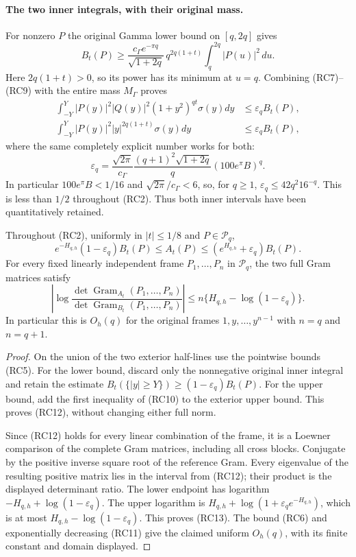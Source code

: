 \paragraph{The two inner integrals, with their original mass.}
For nonzero $P$ the original Gamma lower bound on $[q,2q]$ gives
\[
 B_t(P)\geq
 \frac{c_\Gamma e^{-\pi q}}{\sqrt{1+2q}}\,
 q^{2q(1+t)}\int_q^{2q}|P(u)|^2\,du.              \tag{RC9}
\]
Here $2q(1+t)>0$, so its power has its minimum at $u=q$.
Combining (RC7)--(RC9) with the entire mass $M_\Gamma$ proves
\[
 \begin{split}
 \int_{-Y}^Y|P(y)|^2|Q(y)|^2(1+y^2)^{qt}\sigma(y)dy
       &\leq\varepsilon_q B_t(P),\\
 \int_{-Y}^Y|P(y)|^2|y|^{2q(1+t)}\sigma(y)dy
       &\leq\varepsilon_q B_t(P),
 \end{split}                                    \tag{RC10}
\]
where the same completely explicit number works for both:
\[
 \varepsilon_q=
 \frac{\sqrt{2\pi}}{c_\Gamma}
 \frac{(q+1)^2\sqrt{1+2q}}{q}
          \left(100e^\pi B\right)^q.             \tag{RC11}
\]
In particular $100e^\pi B<1/16$ and
$\sqrt{2\pi}/c_\Gamma<6$, so, for $q\geq1$,
$\varepsilon_q\leq42q^2 16^{-q}$.
This is less than $1/2$ throughout (RC2).
Thus both inner intervals have been quantitatively retained.

\begin{theorem}
Throughout (RC2), uniformly in $|t|\leq1/8$ and
$P\in\mathcal P_q$,
\[
 e^{-H_{q,h}}(1-\varepsilon_q)B_t(P)
 \leq A_t(P)\leq(e^{H_{q,h}}+\varepsilon_q)B_t(P).
 \tag{RC12}
\]
For every fixed linearly independent frame $P_1,\ldots,P_n$
in $\mathcal P_q$, the two full Gram matrices satisfy
\[
 \left|\log
 \frac{\det\operatorname{Gram}_{A_t}(P_1,\ldots,P_n)}
      {\det\operatorname{Gram}_{B_t}(P_1,\ldots,P_n)}
 \right|
 \leq n\{H_{q,h}-\log(1-\varepsilon_q)\}.
 \tag{RC13}
\]
In particular this is $O_h(q)$ for the original frames
$1,y,\ldots,y^{n-1}$ with $n=q$ and $n=q+1$.
\end{theorem}
\begin{proof}
On the union of the two exterior half-lines use the pointwise bounds
(RC5). For the lower bound, discard only the nonnegative original inner
integral and retain the estimate
$B_t(\{|y|\geq Y\})\geq(1-\varepsilon_q)B_t(P)$.
For the upper bound, add the first inequality of (RC10) to the exterior
upper bound. This proves (RC12), without changing either full norm.

Since (RC12) holds for every linear combination of the frame, it is a
Loewner comparison of the complete Gram matrices, including all cross
blocks. Conjugate by the positive inverse square root of the reference
Gram. Every eigenvalue of the resulting positive matrix lies in the
interval from (RC12); their product is the displayed determinant ratio.
The lower endpoint has logarithm
$-H_{q,h}+\log(1-\varepsilon_q)$.
The upper logarithm is
$H_{q,h}+\log(1+\varepsilon_q e^{-H_{q,h}})$, which is at most
$H_{q,h}-\log(1-\varepsilon_q)$.
This proves (RC13).
The bound (RC6) and exponentially decreasing (RC11) give the claimed
uniform $O_h(q)$, with its finite constant and domain displayed.
\end{proof}

